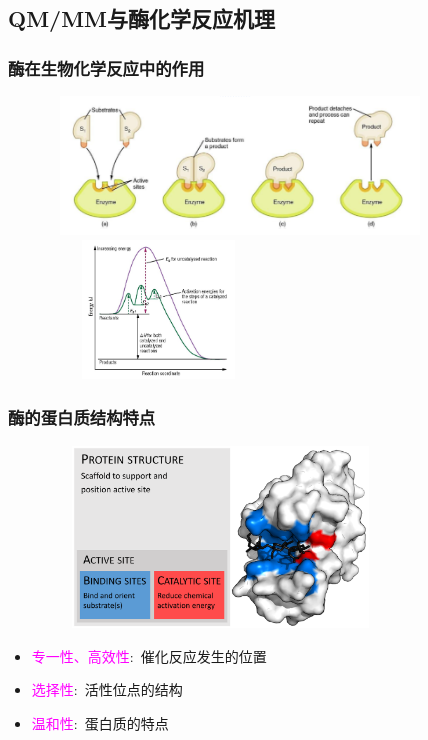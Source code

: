 \subsection{\rm{QM/MM}与酶化学反应机理}
\frame
{
	\frametitle{酶在生物化学反应中的作用}
\begin{figure}[h!]
\centering
\vspace{-5.5pt}
\includegraphics[height=1.45in,width=4.00in,viewport=0 0 800 310,clip]{Figures/enzyme-substrate-3.png}
\includegraphics[height=1.45in,width=2.30in,viewport=0 0 850 780,clip]{Figures/Reaction-with-catalyst.jpg}
\label{Bio-Chem-enzy}
\end{figure}
}

\frame
{
	\frametitle{酶的蛋白质结构特点}
\begin{figure}[h!]
\centering
\vspace{-10.5pt}
\includegraphics[height=1.90in,width=3.60in,viewport=0 0 1950 1200,clip]{Figures/Enzyme_structure.png}
\label{enzyem_Structure}
\end{figure}
\begin{itemize}
	\item \textcolor{magenta}{专一性、高效性}:~催化反应发生的位置
	\item \textcolor{magenta}{选择性}:~活性位点的结构
	\item \textcolor{magenta}{温和性}:~蛋白质的特点
\end{itemize}
}

